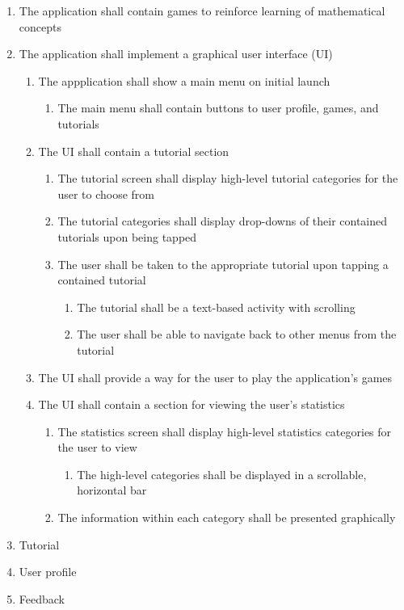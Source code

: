 \documentclass[12pt,letterpaper,oneside]{article}
\begin{document}
\begin{enumerate}
	\item
		The application shall contain games to reinforce learning of mathematical concepts
	\item
		The application shall implement a graphical user interface (UI)
		\begin{enumerate}
			\item
				The appplication shall show a main menu on initial launch
				\begin{enumerate}
					\item
						The main menu shall contain buttons to user profile, games, and tutorials
				\end{enumerate}
			\item
				The UI shall contain a tutorial section
				\begin{enumerate}
					\item
						The tutorial screen shall display high-level tutorial categories for the user to choose from
					\item
						The tutorial categories shall display drop-downs of their contained tutorials upon being tapped
					\item
						The user shall be taken to the appropriate tutorial upon tapping a contained tutorial
						\begin{enumerate}
							\item
								The tutorial shall be a text-based activity with scrolling
							\item
								The user shall be able to navigate back to other menus from the tutorial
						\end{enumerate}
				\end{enumerate}
			\item
				The UI shall provide a way for the user to play the application's games
			\item
				The UI shall contain a section for viewing the user's statistics
				\begin{enumerate}
					\item
						The statistics screen shall display high-level statistics categories for the user to view
						\begin{enumerate}
							\item
								The high-level categories shall be displayed in a scrollable, horizontal bar
						\end{enumerate}
					\item
						The information within each category shall be presented graphically
				\end{enumerate}
		\end{enumerate}
	\item
		Tutorial
	\item
		User profile
	\item
		Feedback
\end{enumerate}
\end{document}
